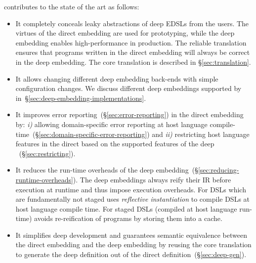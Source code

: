 \yy{} contributes to the state of the art as follows:
\begin{itemize}

  \item It completely conceals leaky abstractions of deep EDSLs from the users.
   The virtues of the direct embedding are used for prototyping, while the deep
   embedding enables high-performance in production. The reliable translation
   ensures that programs written in the direct embedding will always be correct
   in the deep embedding. The core translation is described in \S \ref{sec:translation}.

  \item It allows changing different deep embedding back-ends with simple configuration
   changes. We discuss different deep embeddings supported by \yy
   in~\S \ref{sec:deep-embedding-implementations}.

  \item It improves error reporting~(\S \ref{sec:error-reporting}) in the direct embedding by:
   \emph{i)} allowing domain-specific error reporting at host language
   compile-time~(\S \ref{sec:domain-specific-error-reporting}) and \emph{ii)}
   restricting host language features in the direct \edsl{} based on the
   supported features of the deep \edsl{}~(\S \ref{sec:restricting}).

  \item It reduces the run-time overheads of the deep embedding~(\S \ref{sec:reducing-runtime-overheads}). The deep embeddings
   always reify their IR before execution at runtime and thus impose execution overheads. For DSLs
   which are fundamentally not staged \yy uses \emph{reflective instantiation} to compile DSLs at host language compile time. For staged DSLs (compiled at host language run-time) \yy avoids re-reification of
   programs by storing them into a cache.

  \item It simplifies deep \edsl development and guarantees semantic equivalence
   between the direct embedding and the deep embedding by reusing the core
   translation to generate the deep \edsl definition out of the direct \edsl
   definition~(\S \ref{sec:deep-gen}).

\end{itemize}


